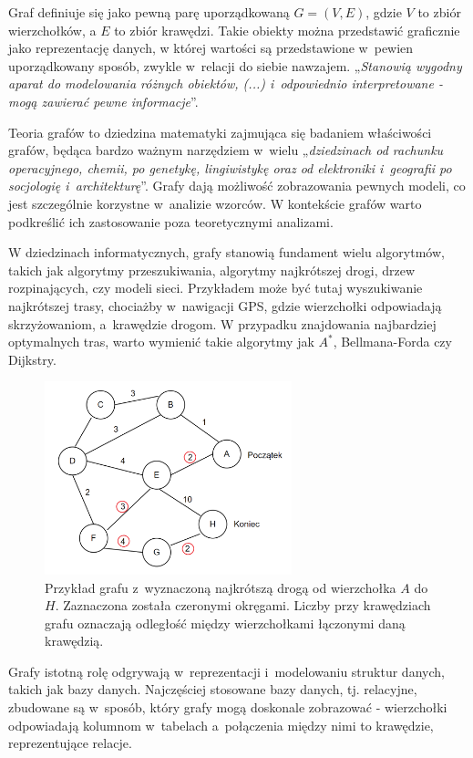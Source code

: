 Graf definiuje się jako pewną parę uporządkowaną $G = (V, E)$, gdzie $V$ to zbiór wierzchołków,
a $E$ to zbiór krawędzi.
Takie obiekty można przedstawić graficznie jako reprezentację danych, %
w której wartości są przedstawione w~pewien uporządkowany sposób, zwykle w~relacji do siebie nawzajem.
„\textit{Stanowią wygodny aparat do modelowania różnych obiektów, (...) i~odpowiednio interpretowane
- mogą zawierać pewne informacje}”\cite{Wloch2008}.

Teoria grafów to dziedzina matematyki zajmująca się badaniem właściwości grafów,
będąca bardzo ważnym narzędziem w~wielu „\textit{dziedzinach od rachunku operacyjnego, chemii, po genetykę, lingiwistykę
oraz od elektroniki i~geografii po socjologię i~architekturę}”\cite{Wilson2012}.
Grafy dają możliwość zobrazowania pewnych modeli, co jest szczególnie korzystne w~analizie wzorców.
W kontekście grafów warto podkreślić ich zastosowanie poza teoretycznymi analizami.

W dziedzinach informatycznych, grafy stanowią fundament wielu algorytmów, takich jak algorytmy przeszukiwania,
algorytmy najkrótszej drogi, drzew rozpinających, czy modeli sieci.
Przykładem może być tutaj wyszukiwanie najkrótszej trasy, chociażby w~nawigacji GPS,
gdzie wierzchołki odpowiadają skrzyżowaniom, a~krawędzie drogom.
W przypadku znajdowania najbardziej optymalnych tras, warto wymienić takie algorytmy jak $A^*$, Bellmana-Forda czy Dijkstry.

\begin{figure}[ht]
	\centering
	\includegraphics[height=5.6cm]{resources/introduction/images/shortest_path.png}
	\caption{Przykład grafu z~wyznaczoną najkrótszą drogą od wierzchołka $A$ do $H$.
		Zaznaczona została czeronymi okręgami.
		Liczby przy krawędziach grafu oznaczają odległość między wierzchołkami łączonymi daną krawędzią.}
    \label{Fig:intro-1}
\end{figure}
\FloatBarrier

Grafy istotną rolę odgrywają w~reprezentacji i~modelowaniu struktur danych, takich jak bazy danych.
Najczęściej stosowane bazy danych, tj. relacyjne, zbudowane są w~sposób, który grafy mogą doskonale zobrazować -
wierzchołki odpowiadają kolumnom w~tabelach a~połączenia między nimi to krawędzie, reprezentujące relacje.


